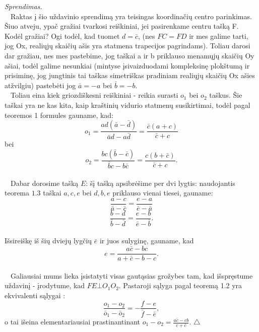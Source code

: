 \documentclass[11pt,a4paper,twoside]{book}
\newenvironment{sprendimas}{\noindent \textit{Sprendimas.}}{\hfill $\triangle$}
\theoremstyle{definition} \newtheorem*{api}{Apibrėžimas}
\theoremstyle{remark} \newtheorem*{pastaba}{Pastaba}
\begin{document}
\begin{sprendimas}
\\ $ \phantom{a}$ Raktas į šio uždavinio sprendimą yra teisingas koordinačių centro parinkimas. 
Šiuo atveju, ypač gražiai tvarkosi reiškiniai, jei pasirenkame centru tašką F. Kodėl gražiai? Ogi 
todėl, kad tuomet $ d = \bar c $, (nes $FC=FD$ ir mes galime tarti, jog Ox, realiųjų skaičių ašis 
yra statmena trapecijos pagrindams). Toliau darosi dar gražiau, nes mes pastebime, jog taškai 
a ir b priklauso menamųjų skaičių Oy ašiai, todėl galime nesunkiai (mintyse įsivaizduodami 
kompleksinę plokštumą ir prisiminę, jog jungtinis tai taškas simetriškas pradiniam realiųjų skaičių 
Ox ašies atžvilgiu) pastebėti jog $ \bar a = - a $ bei $ \bar b = - b$.
\\ $ \phantom{a}$ Toliau eina kiek griozdiškesni reiškiniai - reikia surasti $o_1$ bei $o_2$ taškus. Šie
taškai yra ne kas kita, kaip kraštinių vidurio statmenų susikirtimai, todėl pagal teoremos 1 formules gauname, kad:
$$ o_1 = \frac { ad( \bar a - \bar d) } { \bar a d - a \bar d } = \frac {\bar c ( a + c) } { \bar c + c }  $$ 
bei 
$$  o_2 = \frac { bc( \bar b - \bar c) } { \bar b c - b \bar c } = \frac { c( b + \bar c) } { \bar c + c }.$$
\\$ \phantom{a}$ Dabar dorosime tašką $E$: šį tašką apsibrėšime per dvi lygtis: naudojantis teorema $ 1.3$ taškai $a, c, e$ bei $d, b, e$ priklauso vienai tiesei, gauname:
$$ \frac { a- c} {\bar a-\bar c} = \frac {e-a}{ \bar e - \bar a}$$
$$ \frac { b-d} {\bar b-\bar d} = \frac {e-b}{ \bar e - \bar b}.$$
\\ Išsireiškę iš šių dviejų lygčių  $ \bar e$ ir juos sulyginę, gauname, kad
\\ $$ e = \frac { a \bar c - bc}{ a+ \bar c -b-c}.$$
\\$ \phantom{a}$ Galiausiai mums lieka įsistatyti visas gautąsias grožybes tam, kad išspręstume uždavinį - įrodytume, kad $ FE \bot O_1 O_2 $. Pastaroji sąlyga pagal teoremą 1.2 yra ekvivalenti sąlygai :
 $$  \frac {o_1 - o_2} { \bar o_1 - \bar o_2}= - \frac { f-e}{\bar f - \bar e},$$
o tai išeina elementariausiai prastinantinant $ o_1 - o_2 = \frac {a \bar c - cb} {c + \bar c}$.
\end{sprendimas}
\end{document}
